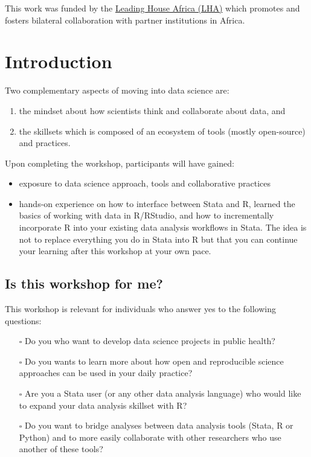 \documentclass[
  letterpaper,
  DIV=11,
  numbers=noendperiod,
  oneside]{scrreprt}
\providecommand{\tightlist}{%
  \setlength{\itemsep}{0pt}\setlength{\parskip}{0pt}}\usepackage{longtable,booktabs,array}
\begin{document}
This work was funded by the
\href{https://www.swisstph.ch/en/research/leading-house-africa/}{Leading
House Africa (LHA)} which promotes and fosters bilateral collaboration
with partner institutions in Africa.


\hypertarget{introduction-1}{%
\chapter{Introduction}\label{introduction-1}}

Two complementary aspects of moving into data science are:

\begin{enumerate}
\def\labelenumi{\arabic{enumi}.}
\tightlist
\item
  the mindset about how scientists think and collaborate about data, and
\item
  the skillsets which is composed of an ecosystem of tools (mostly
  open-source) and practices.
\end{enumerate}

Upon completing the workshop, participants will have gained:

\begin{itemize}
\tightlist
\item
  exposure to data science approach, tools and collaborative practices
\item
  hands-on experience on how to interface between Stata and R, learned
  the basics of working with data in R/RStudio, and how to incrementally
  incorporate R into your existing data analysis workflows in Stata. The
  idea is not to replace everything you do in Stata into R but that you
  can continue your learning after this workshop at your own pace.
\end{itemize}

\hypertarget{is-this-workshop-for-me}{%
\section{Is this workshop for me?}\label{is-this-workshop-for-me}}

This workshop is relevant for individuals who answer yes to the
following questions:

\begin{itemize}
\tightlist
\item[$\square$]
  Do you who want to develop data science projects in public health?
\item[$\square$]
  Do you wants to learn more about how open and reproducible science
  approaches can be used in your daily practice?
\item[$\square$]
  Are you a Stata user (or any other data analysis language) who would
  like to expand your data analysis skillset with R?
\item[$\square$]
  Do you want to bridge analyses between data analysis tools (Stata, R
  or Python) and to more easily collaborate with other researchers who
  use another of these tools?
\end{itemize}
\end{document}
